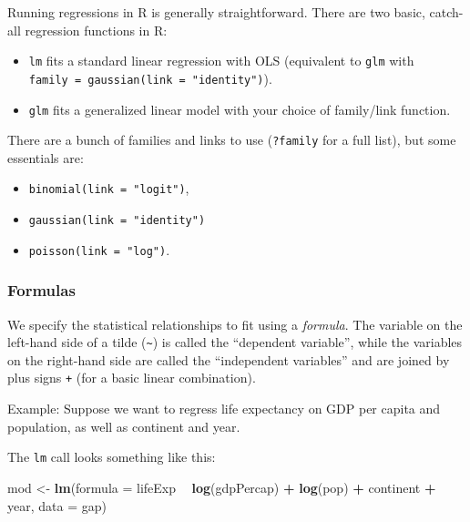 \documentclass[
]{book}
\newenvironment{Shaded}{\begin{snugshade}}{\end{snugshade}}
\newcommand{\DataTypeTok}[1]{\textcolor[rgb]{0.13,0.29,0.53}{#1}}
\newcommand{\KeywordTok}[1]{\textcolor[rgb]{0.13,0.29,0.53}{\textbf{#1}}}
\newcommand{\NormalTok}[1]{#1}
\newcommand{\OperatorTok}[1]{\textcolor[rgb]{0.81,0.36,0.00}{\textbf{#1}}}
\newcommand{\StringTok}[1]{\textcolor[rgb]{0.31,0.60,0.02}{#1}}
\providecommand{\tightlist}{%
  \setlength{\itemsep}{0pt}\setlength{\parskip}{0pt}}
\begin{document}
Running regressions in R is generally straightforward. There are two basic, catch-all regression functions in R:

\begin{itemize}
\item
  \texttt{lm} fits a standard linear regression with OLS (equivalent to \texttt{glm} with \texttt{family\ =\ gaussian(link\ =\ "identity")}).
\item
  \texttt{glm} fits a generalized linear model with your choice of family/link function.
\end{itemize}

There are a bunch of families and links to use (\texttt{?family} for a full list), but some essentials are:

\begin{itemize}
\tightlist
\item
  \texttt{binomial(link\ =\ "logit")},
\item
  \texttt{gaussian(link\ =\ "identity")}
\item
  \texttt{poisson(link\ =\ "log")}.
\end{itemize}

\hypertarget{formulas}{%
\subsubsection*{Formulas}\label{formulas}}

We specify the statistical relationships to fit using a \emph{formula}. The variable on the left-hand side of a tilde (\texttt{\textasciitilde{}}) is called the ``dependent variable'', while the variables on the right-hand side are called the ``independent variables'' and are joined by plus signs \texttt{+} (for a basic linear combination).

Example: Suppose we want to regress life expectancy on GDP per capita and population, as well as continent and year.

The \texttt{lm} call looks something like this:

\begin{Shaded}
\begin{Highlighting}[]
\NormalTok{mod <-}\StringTok{ }\KeywordTok{lm}\NormalTok{(}\DataTypeTok{formula =}\NormalTok{ lifeExp }\OperatorTok{~}\StringTok{ }\KeywordTok{log}\NormalTok{(gdpPercap) }\OperatorTok{+}\StringTok{ }\KeywordTok{log}\NormalTok{(pop) }\OperatorTok{+}\StringTok{ }\NormalTok{continent }\OperatorTok{+}\StringTok{ }\NormalTok{year, }
          \DataTypeTok{data =}\NormalTok{ gap)}
\end{Highlighting}
\end{Shaded}
\end{document}
